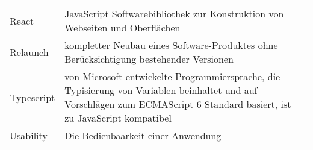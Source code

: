 \begin{longtable}{p{}p{}}
    React & JavaScript Softwarebibliothek zur Konstruktion von Webseiten und Oberflächen\\

    Relaunch & kompletter Neubau eines Software-Produktes ohne Berücksichtigung bestehender Versionen\\

    Typescript & von Microsoft entwickelte Programmiersprache, die Typisierung von Variablen beinhaltet und auf Vorschlägen zum ECMAScript 6 Standard basiert, ist zu JavaScript kompatibel\\

    Usability & Die Bedienbaarkeit einer Anwendung\\

\end{longtable}